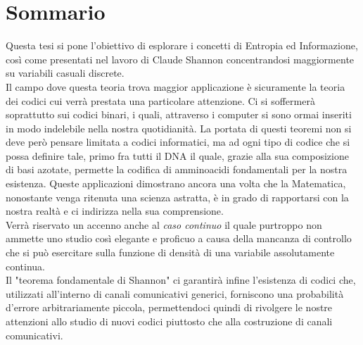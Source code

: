 \chapter*{Sommario} %
\label{sommario}

Questa tesi si pone l'obiettivo di esplorare i concetti di Entropia ed Informazione, così come presentati nel lavoro di Claude Shannon \cite{Shannon} concentrandosi maggiormente su variabili casuali discrete.\\
Il campo dove questa teoria trova maggior applicazione è sicuramente la teoria dei codici cui verrà prestata una particolare attenzione. Ci si soffermerà soprattutto sui codici binari, i quali, attraverso i computer si sono ormai inseriti in modo indelebile nella nostra quotidianità. La portata di questi teoremi non si deve però pensare limitata a codici informatici, ma ad ogni tipo di codice che si possa definire tale, primo fra tutti il DNA il quale, grazie alla sua composizione di basi azotate, permette la codifica di amminoacidi fondamentali per la nostra esistenza. Queste applicazioni dimostrano ancora una volta che la Matematica, nonostante venga ritenuta una scienza astratta, è in grado di rapportarsi con la nostra realtà e ci indirizza nella sua comprensione.\\
Verrà riservato un accenno anche al \textit{caso continuo} il quale purtroppo non ammette uno studio così elegante e proficuo a causa della mancanza di controllo che si può esercitare sulla funzione di densità di una variabile assolutamente continua.\\
Il "teorema fondamentale di Shannon" ci garantirà infine l'esistenza di codici che, utilizzati all'interno di canali comunicativi generici, forniscono una probabilità d'errore arbitrariamente piccola, permettendoci quindi di rivolgere le nostre attenzioni allo studio di nuovi codici piuttosto che alla costruzione di canali comunicativi.


\clearpage


